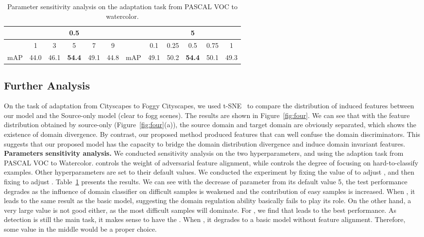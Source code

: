 \documentclass[runningheads]{llncs}
\begin{document}
\begin{table}[t]
\begin{center}
\caption{Parameter sensitivity analysis on the adaptation task
	from PASCAL VOC to watercolor. }
\setlength{\tabcolsep}{4pt}
{
\begin{tabular}{c|ccccc||c|ccccc}
\hline
	 &\multicolumn{5}{c||}{0.5}   
	&  &\multicolumn{5}{c}{5}\\ \hline 
	 & 1 & 3 & 5 & 7 & 9
	& & 0.1 & 0.25 & 0.5 & 0.75 & 1\\ \hline
	mAP & 44.0 & 46.1 & \bf54.4 & 49.1 &44.8
	& mAP & 49.1 & 50.2 & \bf54.4 & 50.1 &49.3\\ 
\hline
\end{tabular}}
\label{tab:five}
\end{center}
\end{table}



\subsection{Further Analysis}


On the task of adaptation from Cityscapes to Foggy Cityscapes, 
we used t-SNE~\cite{maaten2008visualizing} to compare the distribution of induced features between our model and the Source-only model (clear to fogg scenes).
The results are shown in Figure~\ref{fig:four}. We can see that with the feature distribution obtained by source-only (Figure~\ref{fig:four}(a)),  
the source domain and target domain are obviously separated, which shows the existence of domain divergence. 
By contrast, our proposed method produced features that can well confuse the domain discriminators.
This suggests that our proposed model has the capacity to bridge the domain distribution divergence and induce domain invariant features.
\\

\noindent
{\bf Parameters sensitivity analysis.} 
We conducted sensitivity analysis on the two hyperparameters,  and 
using the adaption task from PASCAL VOC to Watercolor. 
 controls the weight of adversarial feature alignment,
while  controls the degree of focusing on hard-to-classify examples.
Other hyperparameters are set to their default values. 
We conducted the experiment by fixing the value of  to adjust , 
and then fixing  to adjust .
Table~\ref{tab:five} presents the results.
We can see
with the decrease of parameter  from its default value 5, 
the test performance degrades as
the influence of domain classifier on difficult samples 
is weakened and the contribution of easy samples is increased.  
When , it leads to the same result as the basic model,
suggesting the domain regulation ability basically fails to play its role. 
On the other hand, a very large  value is not good either, 
as the most difficult samples will dominate.
For , we find that  leads to the best performance. 
As detection is still the main task, it makes sense to have the . 
When , it degrades to a basic model without feature alignment. 
Therefore, some value in the middle would be a proper choice.
\\
\end{document}
